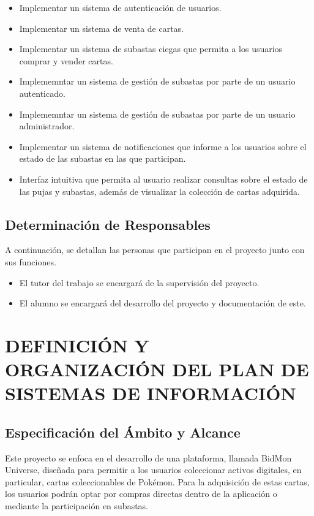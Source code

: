 \begin{itemize}
    \item Implementar un sistema de autenticación de usuarios.
    \item Implementar un sistema de venta de cartas.
    \item Implementar un sistema de subastas ciegas que permita a los usuarios comprar y vender cartas.
    \item Implememntar un sistema de gestión de subastas por parte de un usuario autenticado.
    \item Implememntar un sistema de gestión de subastas por parte de un usuario administrador.
    \item Implementar un sistema de notificaciones que informe a los usuarios sobre el estado de las subastas en las que participan.
    \item Interfaz intuitiva que permita al usuario realizar consultas sobre el estado de las pujas y subastas, además de visualizar la colección de cartas adquirida.
\end{itemize}

\subsection{Determinación de Responsables}
A continuación, se detallan las personas que participan en el proyecto junto con sus funciones.
\begin{itemize}
    \item El tutor del trabajo se encargará de la supervisión del proyecto.
    \item El alumno se encargará del desarrollo del proyecto y documentación de este. 
\end{itemize}

\newpage
\section{DEFINICIÓN Y ORGANIZACIÓN DEL PLAN DE SISTEMAS DE INFORMACIÓN}
 

\subsection{Especificación del Ámbito y Alcance} \label{sec:2_2_1-Especificacion_ambito_alcance}
\hypertarget{sec:2_2_1-Especificacion_ambito_alcance}{}
Este proyecto se enfoca en el desarrollo de una plataforma, llamada BidMon Universe, diseñada para permitir a los usuarios coleccionar activos digitales, en particular, cartas coleccionables de Pokémon. 
Para la adquisición de estas cartas, los usuarios podrán optar por compras directas dentro de la aplicación o mediante la participación en subastas.


